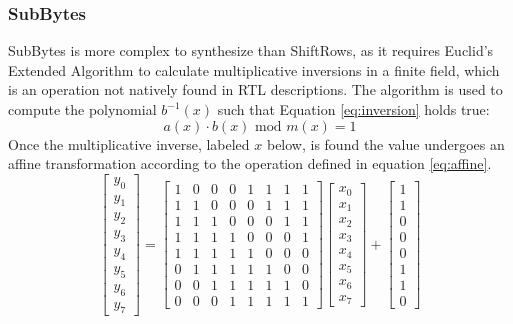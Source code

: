 \documentclass[11pt,journal,compsoc, onecolumn]{IEEEtran}
\begin{document}
\subsubsection{SubBytes}\label{sec:subbytes}
SubBytes is more complex to synthesize than ShiftRows, as it requires Euclid's Extended Algorithm to calculate multiplicative inversions in a finite field, which is an operation not natively found in RTL descriptions. The algorithm is used to compute the polynomial $b^{-1}(x)$ such that Equation \ref{eq:inversion} holds true:
\begin{equation}\label{eq:inversion}
	a(x)\cdot b(x)\text{ mod }m(x)=1
\end{equation}
Once the multiplicative inverse, labeled $x$ below, is found the value undergoes an affine transformation according to the operation defined in equation \ref{eq:affine}.
\begin{equation}\label{eq:affine}
	\begin{bmatrix}
		y_0 \\
		y_1 \\
		y_2 \\
		y_3 \\
		y_4 \\
		y_5 \\
		y_6 \\
		y_7 
	\end{bmatrix}
	=
	\begin{bmatrix}
		1 & 0 & 0 & 0 & 1 & 1 & 1 & 1 \\
		1 & 1 & 0 & 0 & 0 & 1 & 1 & 1 \\
		1 & 1 & 1 & 0 & 0 & 0 & 1 & 1 \\
		1 & 1 & 1 & 1 & 0 & 0 & 0 & 1 \\
		1 & 1 & 1 & 1 & 1 & 0 & 0 & 0 \\
		0 & 1 & 1 & 1 & 1 & 1 & 0 & 0 \\
		0 & 0 & 1 & 1 & 1 & 1 & 1 & 0 \\
		0 & 0 & 0 & 1 & 1 & 1 & 1 & 1 
	\end{bmatrix}
	\begin{bmatrix}
		x_0 \\
		x_1 \\
		x_2 \\
		x_3 \\
		x_4 \\
		x_5 \\
		x_6 \\
		x_7 
	\end{bmatrix}
	+
	\begin{bmatrix}
		1 \\
		1 \\
		0 \\
		0 \\
		0 \\
		1 \\
		1 \\
		0 
	\end{bmatrix}
\end{equation}	
\end{document}
